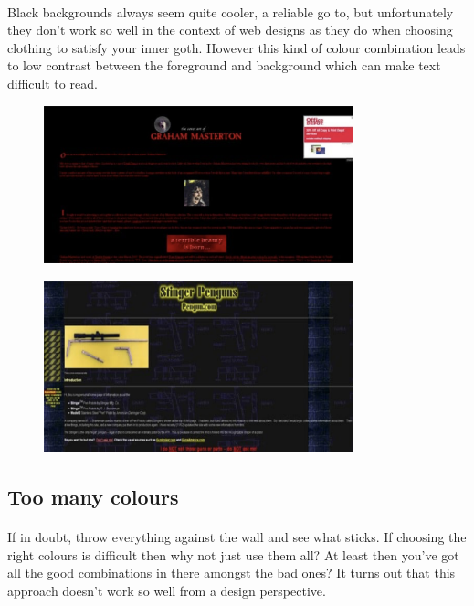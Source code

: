 \paragraph{} Black backgrounds always seem quite cooler, a reliable go to, but unfortunately they don't work so well in the context of web designs as they do when choosing clothing to satisfy your inner goth. However this kind of colour combination leads to low contrast between the foreground and background which can make text difficult to read.



\begin{figure}[H]
    \centering
    \includegraphics[width=0.8\textwidth]{figures/bad-colours_black.background-1}
    \label{fig:bad-colours_black.background-1}
    \caption{}
\end{figure}


\begin{figure}[H]
    \centering
    \includegraphics[width=0.8\textwidth]{figures/bad-colours_black.background-2}
    \label{fig:bad-colours_black.background-2}
    \caption{}
\end{figure}



\subsection{Too many colours}
\paragraph{} If in doubt, throw everything against the wall and see what sticks. If choosing the right colours is difficult then why not just use them all? At least then you've got all the good combinations in there amongst the bad ones? It turns out that this approach doesn't work so well from a design perspective.



